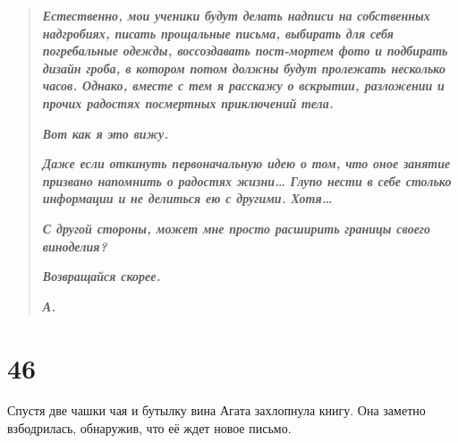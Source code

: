 \documentclass[
  a5paperpaper,
  DIV=11,
  numbers=noendperiod]{scrreprt}
\begin{document}
\begin{quote}
\textbf{\emph{Естественно, мои ученики будут делать надписи на
собственных надгробиях, писать прощальные письма, выбирать для себя
погребальные одежды, воссоздавать пост-мортем фото и подбирать дизайн
гроба, в котором потом должны будут пролежать несколько часов. Однако,
вместе с тем я расскажу о вскрытии, разложении и прочих радостях
посмертных приключений тела.}}

\textbf{\emph{Вот как я это вижу.}}

\textbf{\emph{Даже если откинуть первоначальную идею о том, что оное
занятие призвано напомнить о радостях жизни\ldots{} Глупо нести в себе
столько информации и не делиться ею с другими. Хотя\ldots{}}}

\textbf{\emph{С другой стороны, может мне просто расширить границы
своего виноделия?}}

\textbf{\emph{Возвращайся скорее.}}

\textbf{\emph{А.}}
\end{quote}

\section*{46}\label{46}


Спустя две чашки чая и бутылку вина Агата захлопнула книгу. Она заметно
взбодрилась, обнаружив, что её ждет новое письмо.
\end{document}
